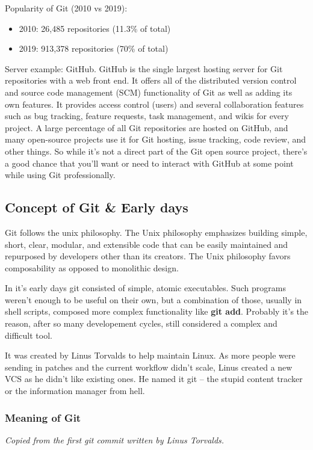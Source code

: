 \documentclass[12pt,a4]{article}
\newcommand{\ilcode}[1]{\textcolor[RGB]{160, 110, 220}{#1}}
\begin{document}
Popularity of Git (2010 vs 2019):
\vspace*{-5pt}
\begin{itemize}
\item 2010: 26,485 repositories (11.3\% of total)
\item 2019: 913,378 repositories (70\% of total)
\end{itemize}

{\sf Server example:} GitHub. GitHub is the single largest hosting server for
Git repositories with a web front end. It offers all of the distributed version
control and source code management (SCM) functionality of Git as well as adding
its own features. It provides access control (users) and several collaboration
features such as bug tracking, feature requests, task management, and wikis for
every project. A large percentage of all Git repositories are hosted on GitHub,
and many open-source projects use it for Git hosting, issue tracking, code
review, and other things. So while it’s not a direct part of the Git open source
project, there’s a good chance that you’ll want or need to interact with GitHub
at some point while using Git professionally.

\subsection{Concept of Git \& Early days}
Git follows the unix philosophy. The Unix philosophy emphasizes building simple,
short, clear, modular, and extensible code that can be easily maintained and
repurposed by developers other than its creators. The Unix philosophy favors
composability as opposed to monolithic design.

In it's early days git consisted of simple, atomic executables. Such programs
weren't enough to be useful on their own, but a combination of those, usually in
shell scripts, composed more complex functionality like \ilcode{\bf git add}.
Probably it's the reason, after so many developement cycles, still considered a
complex and difficult tool.

It was created by Linus Torvalds to help maintain Linux. As more people were
sending in patches and the current workflow didn't scale, Linus created a new
VCS as he didn't like existing ones. He named it git -- the stupid content
tracker or the information manager from hell.

\subsubsection{Meaning of Git}
\vspace*{-10pt}
\emph{Copied from the first git commit written by Linus Torvalds.}
\end{document}
